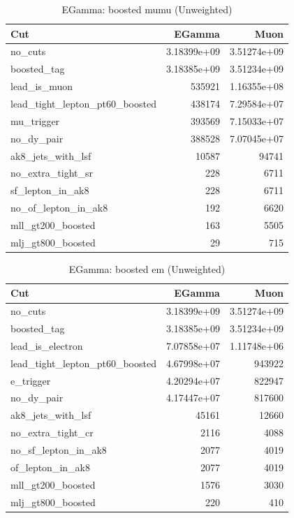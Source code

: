 \documentclass{article}
\begin{document}
\begin{table}[htbp]
\centering
\caption{EGamma: boosted mumu (Unweighted)}
\begin{tabular}{lrr}
\hline
Cut & EGamma & Muon \\
\hline
no\_cuts & 3.18399e+09 & 3.51274e+09 \\
boosted\_tag & 3.18385e+09 & 3.51234e+09 \\
lead\_is\_muon & 535921 & 1.16355e+08 \\
lead\_tight\_lepton\_pt60\_boosted & 438174 & 7.29584e+07 \\
mu\_trigger & 393569 & 7.15033e+07 \\
no\_dy\_pair & 388528 & 7.07045e+07 \\
ak8\_jets\_with\_lsf & 10587 & 94741 \\
no\_extra\_tight\_sr & 228 & 6711 \\
sf\_lepton\_in\_ak8 & 228 & 6711 \\
no\_of\_lepton\_in\_ak8 & 192 & 6620 \\
mll\_gt200\_boosted & 163 & 5505 \\
mlj\_gt800\_boosted & 29 & 715 \\
\hline
\end{tabular}
\end{table}

\begin{table}[htbp]
\centering
\caption{EGamma: boosted em (Unweighted)}
\begin{tabular}{lrr}
\hline
Cut & EGamma & Muon \\
\hline
no\_cuts & 3.18399e+09 & 3.51274e+09 \\
boosted\_tag & 3.18385e+09 & 3.51234e+09 \\
lead\_is\_electron & 7.07858e+07 & 1.11748e+06 \\
lead\_tight\_lepton\_pt60\_boosted & 4.67998e+07 & 943922 \\
e\_trigger & 4.20294e+07 & 822947 \\
no\_dy\_pair & 4.17447e+07 & 817600 \\
ak8\_jets\_with\_lsf & 45161 & 12660 \\
no\_extra\_tight\_cr & 2116 & 4088 \\
no\_sf\_lepton\_in\_ak8 & 2077 & 4019 \\
of\_lepton\_in\_ak8 & 2077 & 4019 \\
mll\_gt200\_boosted & 1576 & 3030 \\
mlj\_gt800\_boosted & 220 & 410 \\
\hline
\end{tabular}
\end{table}
\end{document}
